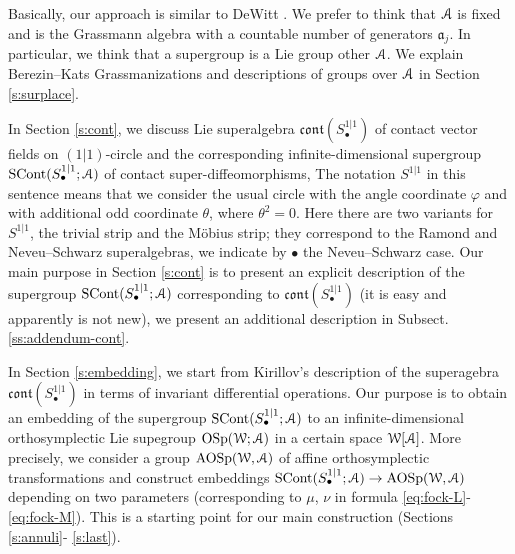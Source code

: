 \documentclass[]{amsart}
\newcounter{sec}
\def\OSp{\mathrm {OSp}}
\def\AOSp{\mathrm {AOSp}}
\def\phi{\varphi}
\def\cA{\EuScript A}
\def\cW{\EuScript W}
\def\fra{\mathfrak a}
\def\SCont{\mathrm{SCont}}
\def\cont{\mathfrak{cont}}
\begin{document}
 


 Basically, our approach  is similar to  DeWitt \cite{DeW}.
 We prefer to think that $\cA$
 is fixed and is the Grassmann algebra with a countable number of generators  $\fra_j$.
 In particular, we think that a supergroup is a Lie group other $\cA$.
 We explain Berezin--Kats Grassmanizations and descriptions	 of groups over $\cA$
 in Section \ref{s:surplace}.
 

In Section \ref{s:cont}, we discuss
Lie superalgebra $\cont(S^{1|1}_\bullet)$ of contact vector fields on $(1|1)$-circle
and the corresponding infinite-dimensional  supergroup $\SCont(S^{1|1}_\bullet;\cA)$
of contact super-diffeomorphisms, The notation $S^{1|1}$ in this sentence 
means that we consider the usual circle with the angle coordinate $\phi$
and with additional odd coordinate $\theta$, where $\theta^2=0$. Here there are two
variants for $S^{1|1}$, the trivial strip and the M\"obius strip; they correspond to the Ramond and 
Neveu--Schwarz superalgebras, we indicate by $\bullet$ the Neveu--Schwarz case. 
Our main purpose in Section \ref{s:cont} is to present an explicit description
of the supergroup $\SCont(S^{1|1}_\bullet;\cA)$ corresponding to $\cont(S^{1|1}_\bullet)$
(it is easy and apparently is not new), we present an additional description 
in Subsect. \ref{ss:addendum-cont}.

In Section \ref{s:embedding}, we start from   Kirillov's description
\cite{Kir} of the superagebra $\cont(S^{1|1}_\bullet)$ in terms of
invariant differential operations.
Our purpose is to obtain an  embedding of the supergroup $\SCont(S^{1|1}_\bullet;\cA)$
 to an infinite-dimensional orthosymplectic Lie supegroup
 $\OSp(\cW;\cA)$ in a certain space $\cW[\cA]$. More precisely,
 we consider a group $\AOSp(\cW,\cA)$ of affine orthosymplectic transformations 
 and construct 
  embeddings $\SCont(S^{1|1}_\bullet;\cA)\to \AOSp(\cW,\cA)$ depending on
 two  parameters (corresponding to $\mu$, $\nu$
  in formula \eqref{eq:fock-L}-\eqref{eq:fock-M}).
 This is a starting point for our main construction (Sections \ref{s:annuli}-
 \ref{s:last}).
  
\end{document}
